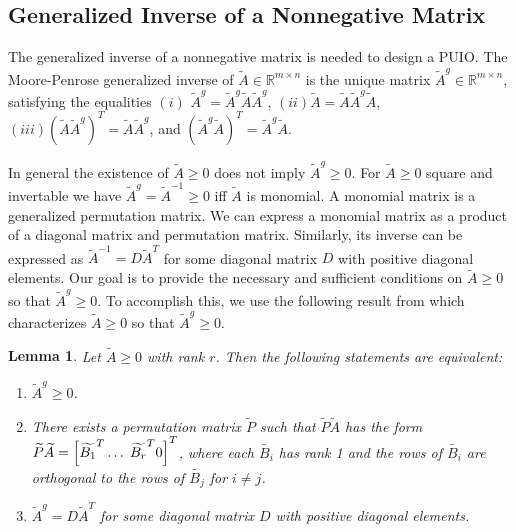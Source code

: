\documentclass[letterpaper, 10 pt, conference]{ieeeconf}  %
\newtheorem{lemma}{Lemma}
\def\R{\mathbb{R}}
\def\gez{\geq 0}
\newcommand{\ie}{\textit{i}.\textit{e}., }
\begin{document}
\subsection{Generalized Inverse of a Nonnegative Matrix}
The generalized inverse of a nonnegative matrix is needed to design a PUIO. The Moore-Penrose generalized inverse of $\widetilde{A} \in \R^{m \times n}$ is the unique matrix $\widetilde{A}^g \in \R^{m \times n}$, satisfying the equalities $(i)$ $\widetilde{A}^g = \widetilde{A}^g \widetilde{A} \widetilde{A}^g$, $(ii) \widetilde{A}= \widetilde{A} \widetilde{A}^g \widetilde{A}$, $(iii) (\widetilde{A} \widetilde{A}^g)^T = \widetilde{A} \widetilde{A}^g$, and $(\widetilde{A}^g \widetilde{A})^T = \widetilde{A}^g \widetilde{A}$. %

In general the existence of $\widetilde{A} \gez$ does not imply $\widetilde{A}^g \gez$. For $\widetilde{A} \gez$ square and invertable we have $\widetilde{A}^g = \widetilde{A}^{-1} \geq 0$ iff $\widetilde{A}$ is monomial. A monomial matrix is a generalized permutation matrix. %
We can express a monomial matrix as a product of a diagonal matrix and permutation matrix. Similarly, its inverse can be expressed as $\widetilde{A}^{-1} = D\widetilde{A}^T$ for some diagonal matrix $D$ with positive diagonal elements.  Our goal is to provide the necessary and sufficient conditions on $\widetilde{A} \geq 0$ so that $\widetilde{A}^g \geq 0$. To accomplish this, we use the following result from \cite{berman_nonnegative_1989} which characterizes $\widetilde{A} \geq 0$ so that $\widetilde{A}^g \geq 0$. 

\begin{lemma} \label{lem:pinvP}
Let $\widetilde{A} \gez$ with rank $r$.  Then the following statements are equivalent:
\begin{enumerate}
\item $\widetilde{A}^g \gez$.
\item There exists a permutation matrix $\widetilde{P}$ such that $\widetilde{P}\widetilde{A}$ has the form $\widetilde{P}\widetilde{A} = \left [ \widetilde{B_1}^T\ldots\hspace{1mm}\widetilde{B_r}^T  0 \right ]^T$,
where each $\widetilde{B_i}$ has rank 1 and the rows of $\widetilde{B_i}$ are orthogonal to the rows of $\widetilde{B_j}$ for $i \neq j$.
\item $\widetilde{A}^g = D \widetilde{A}^T$ for some diagonal matrix $D$ with positive diagonal elements.
\end{enumerate}
\end{lemma}
\end{document}
